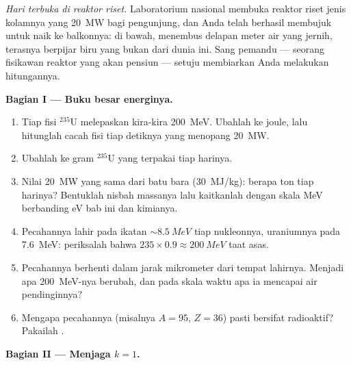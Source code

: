 \begin{problem}\label{pb:b3:nuclear-physics:1}
\emph{Hari terbuka di reaktor riset.} Laboratorium nasional
membuka reaktor riset jenis kolamnya yang \qty{20}{MW} bagi pengunjung, dan
Anda telah berhasil membujuk untuk naik ke balkonnya: di bawah, menembus delapan
meter air yang jernih, terasnya berpijar biru yang bukan dari dunia ini.
Sang pemandu --- seorang fisikawan reaktor yang akan pensiun --- setuju membiarkan
Anda melakukan hitungannya.

\medskip\noindent\textbf{Bagian I --- Buku besar energinya.}

\begin{enumerate}
  \item Tiap fisi $^{235}$U melepaskan kira-kira \qty{200}{MeV}.
        Ubahlah ke joule, lalu hitunglah cacah fisi tiap detiknya
        yang menopang \qty{20}{MW}.
  \item Ubahlah ke gram $^{235}$U yang terpakai tiap harinya.
  \item Nilai \qty{20}{MW} yang sama dari batu bara (\qty{30}{MJ/kg}): berapa ton
        tiap harinya? Bentuklah nisbah massanya lalu kaitkanlah dengan
        skala \unit{MeV} berbanding \unit{eV} bab ini dan
        kimianya.
  \item Pecahannya lahir pada ikatan $\sim\qty{8.5}{MeV}$ tiap
        nukleonnya, uraniumnya pada \qty{7.6}{MeV}: periksalah bahwa
        $235\times0.9 \approx \qty{200}{MeV}$ taat asas.
  \item Pecahannya berhenti dalam jarak mikrometer dari tempat lahirnya.
        Menjadi apa \qty{200}{MeV}-nya berubah, dan pada skala waktu apa
        ia mencapai air pendinginnya?
  \item Mengapa pecahannya (misalnya $A = 95$, $Z = 36$)
        pasti bersifat radioaktif? Pakailah .
\end{enumerate}

\medskip\noindent\textbf{Bagian II --- Menjaga $k = 1$.}


\end{problem}

